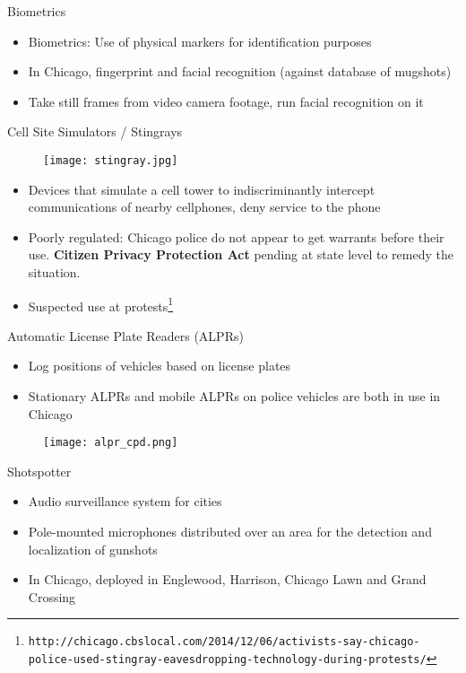 \documentclass[newPxFont]{beamer}
\begin{document}
\begin{frame}{Biometrics}
\begin{itemize}
\item<1-> Biometrics: Use of physical markers for identification purposes
\item<2-> In Chicago, fingerprint and facial recognition (against database of mugshots)
\item<3-> Take still frames from video camera footage, run facial recognition on it
\end{itemize}
\end{frame}


\begin{frame}{Cell Site Simulators / Stingrays}
\begin{figure}
\centering
\texttt{[image: stingray.jpg]}
\end{figure}
\begin{itemize}
\item<1-> Devices that simulate a cell tower to indiscriminantly intercept communications of nearby cellphones, deny service to the phone
\item<2-> Poorly regulated: Chicago police do not appear to get warrants before their use. \textbf{Citizen Privacy Protection Act} pending at state level to remedy the situation.
\item<3-> Suspected use at protests\footnote{\texttt{\tiny http://chicago.cbslocal.com/2014/12/06/activists-say-chicago-police-used-stingray-eavesdropping-technology-during-protests/}}
\end{itemize}
\end{frame}


\begin{frame}{Automatic License Plate Readers (ALPRs)}
\begin{itemize}
\item<1-> Log positions of vehicles based on license plates
\item<2-> Stationary ALPRs and mobile ALPRs on police vehicles are both in use in Chicago
\end{itemize}
\begin{figure}
\centering
\texttt{[image: alpr\_cpd.png]}
\end{figure}
\end{frame}


\begin{frame}{Shotspotter}
\begin{itemize}
\item<1-> Audio surveillance system for cities
\item<2-> Pole-mounted microphones distributed over an area for the detection and localization of gunshots
\item<3-> In Chicago, deployed in Englewood, Harrison, Chicago Lawn and Grand Crossing
\end{itemize}
\end{frame}
\end{document}
